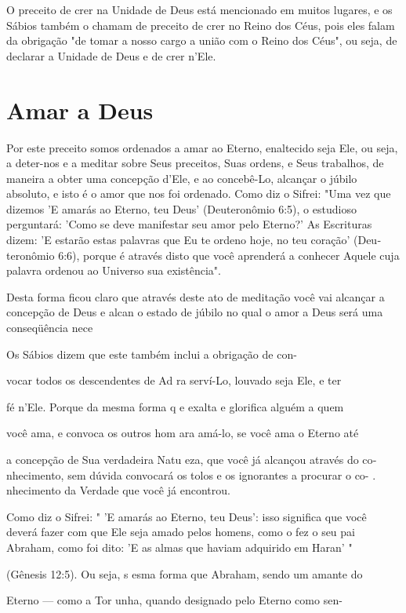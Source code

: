 O preceito de crer na Unidade de Deus está mencionado em muitos lugares,
e os Sábios também o chamam de preceito de crer no Reino dos Céus,
pois eles falam da obrigação "de tomar a nosso cargo a união com o Reino
dos Céus", ou seja, de declarar a Unidade de Deus e de crer n'Ele.

\section{Amar a Deus}

Por este preceito somos ordenados a amar ao Eterno, enaltecido se­ja
Ele, ou seja, a deter-nos e a meditar sobre Seus preceitos, Suas ordens,
e Seus trabalhos, de maneira a obter uma concepção d'Ele, e ao
concebê-Lo, alcançar o júbilo absoluto, e isto é o amor que nos foi
ordenado. Como diz o Sifrei: "Uma vez que dizemos 'E amarás ao Eterno,
teu Deus' (Deuteronômio 6:5), o estu­dioso perguntará: 'Como se deve
manifestar seu amor pelo Eterno?' As Escritu­ras dizem: 'E estarão estas
palavras que Eu te ordeno hoje, no teu coração' (Deu­teronômio 6:6),
porque é através disto que você aprenderá a conhecer Aquele cuja palavra
ordenou ao Universo sua existência".

Desta forma ficou claro que através deste ato de meditação você vai
alcançar a concepção de Deus e alcan o estado de júbilo no qual o amor a
Deus será uma conseqüência nece


Os Sábios dizem que este também inclui a obrigação de con-


vocar todos os descendentes de Ad ra serví-Lo, louvado seja Ele, e ter

fé n'Ele. Porque da mesma forma q e exalta e glorifica alguém a quem

você ama, e convoca os outros hom ara amá-lo, se você ama o Eterno até

a concepção de Sua verdadeira Natu eza, que você já alcançou através do
co­nhecimento, sem dúvida convocará os tolos e os ignorantes a procurar
o co- . nhecimento da Verdade que você já encontrou.

Como diz o Sifrei: " 'E amarás ao Eterno, teu Deus': isso significa que
você deverá fazer com que Ele seja amado pelos homens, como o fez o seu
pai Abraham, como foi dito: 'E as almas que haviam adquirido em Haran' "

(Gênesis 12:5). Ou seja, s esma forma que Abraham, sendo um amante do

Eterno --- como a Tor unha, quando designado pelo Eterno como sen-

